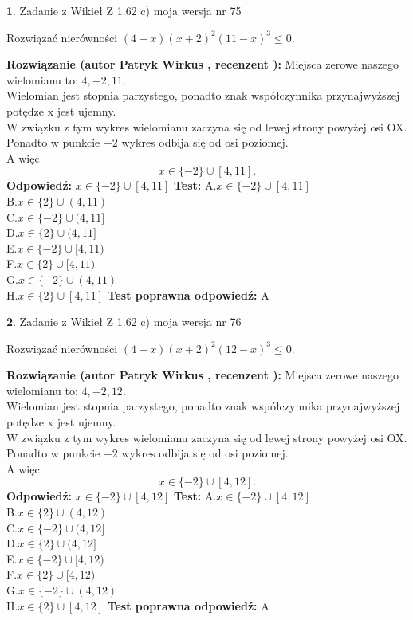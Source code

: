 \documentclass[12pt, a4paper]{article}
\theoremstyle{definition} %
\newtheorem{zad}{}
\newcommand{\zadStart}[1]{\begin{zad}#1\newline}
\newcommand{\zadStop}{\end{zad}}
\newcommand{\rozwStart}[2]{\noindent \textbf{Rozwiązanie (autor #1 , recenzent #2): }\newline}
\newcommand{\rozwStop}{\newline}
\newcommand{\odpStart}{\noindent \textbf{Odpowiedź:}\newline}
\newcommand{\odpStop}{\newline}
\newcommand{\testStart}{\noindent \textbf{Test:}\newline}
\newcommand{\testStop}{\newline}
\newcommand{\kluczStart}{\noindent \textbf{Test poprawna odpowiedź:}\newline}
\newcommand{\kluczStop}{\newline}
\begin{document}
\zadStart{Zadanie z Wikieł Z 1.62 c) moja wersja nr 75}

Rozwiązać nierówności $(4-x)(x+2)^{2}(11-x)^{3}\le0$.
\zadStop
\rozwStart{Patryk Wirkus}{}
Miejsca zerowe naszego wielomianu to: $4, -2, 11$.\\
Wielomian jest stopnia parzystego, ponadto znak współczynnika przy\linebreak najwyższej potędze x jest ujemny.\\ W związku z tym wykres wielomianu zaczyna się od lewej strony powyżej osi OX.\\
Ponadto w punkcie $-2$ wykres odbija się od osi poziomej.\\
A więc $$x \in \{-2\} \cup [4,11].$$
\rozwStop
\odpStart
$x \in \{-2\} \cup [4,11]$
\odpStop
\testStart
A.$x \in \{-2\} \cup [4,11]$\\
B.$x \in \{2\} \cup (4,11)$\\
C.$x \in \{-2\} \cup (4,11]$\\
D.$x \in \{2\} \cup (4,11]$\\
E.$x \in \{-2\} \cup [4,11)$\\
F.$x \in \{2\} \cup [4,11)$\\
G.$x \in \{-2\} \cup (4,11)$\\
H.$x \in \{2\} \cup [4,11]$
\testStop
\kluczStart
A
\kluczStop



\zadStart{Zadanie z Wikieł Z 1.62 c) moja wersja nr 76}

Rozwiązać nierówności $(4-x)(x+2)^{2}(12-x)^{3}\le0$.
\zadStop
\rozwStart{Patryk Wirkus}{}
Miejsca zerowe naszego wielomianu to: $4, -2, 12$.\\
Wielomian jest stopnia parzystego, ponadto znak współczynnika przy\linebreak najwyższej potędze x jest ujemny.\\ W związku z tym wykres wielomianu zaczyna się od lewej strony powyżej osi OX.\\
Ponadto w punkcie $-2$ wykres odbija się od osi poziomej.\\
A więc $$x \in \{-2\} \cup [4,12].$$
\rozwStop
\odpStart
$x \in \{-2\} \cup [4,12]$
\odpStop
\testStart
A.$x \in \{-2\} \cup [4,12]$\\
B.$x \in \{2\} \cup (4,12)$\\
C.$x \in \{-2\} \cup (4,12]$\\
D.$x \in \{2\} \cup (4,12]$\\
E.$x \in \{-2\} \cup [4,12)$\\
F.$x \in \{2\} \cup [4,12)$\\
G.$x \in \{-2\} \cup (4,12)$\\
H.$x \in \{2\} \cup [4,12]$
\testStop
\kluczStart
A
\kluczStop
\end{document}
